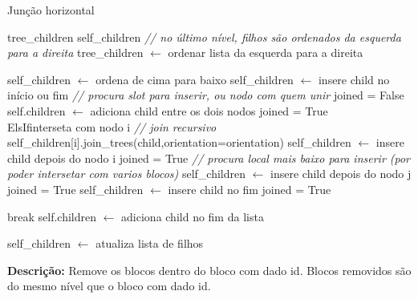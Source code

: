 \begin{breakablealgorithm}
	\caption{Junção horizontal}
	\footnotesize
	\begin{algorithmic}[1]
		\State tree\_children
		\State self\_children
		\State \textit{// no último nível, filhos são ordenados da esquerda para a direita}
			\State tree\_children $\leftarrow$ ordenar lista da esquerda para a direita
		\EndIf
		
				\State self\_children $\leftarrow$ ordena de cima para baixo
					\State self\_children $\leftarrow$ insere child no início ou fim
				\Else
					\State \textit{// procura slot para inserir, ou nodo com quem unir}
					\State joined = False
							\State self.children $\leftarrow$ adiciona child entre os dois nodos
							\State joined = True
						\\ElsIf{interseta com nodo i}
									\State \textit{// join recursivo}
									\State self\_children[i].join\_trees(child,orientation=orientation)
								\Else
									\State self\_children $\leftarrow$ insere child depois do nodo i
								\EndIf
								\State joined = True
							\Else
								\State \textit{// procura local mais baixo para inserir (por poder intersetar com varios blocos)}
										\State self\_children $\leftarrow$ insere child depois do nodo j
										\State joined = True
									\EndIf
								\EndFor
									\State self\_children $\leftarrow$ insere child no fim
									\State joined = True
								\EndIf
							\EndIf
						\EndIf
						
							\State break
						\EndIf
					\EndFor
				\EndIf
			\Else
				\State self.children $\leftarrow$ adiciona child no fim da lista
			\EndIf
			
			\State self\_children $\leftarrow$ atualiza lista de filhos
		\EndFor
		
		
	\end{algorithmic}
\end{breakablealgorithm}



\textbf{Descrição:} Remove os blocos dentro do bloco com dado id. Blocos removidos são do mesmo nível que o bloco com dado id.


